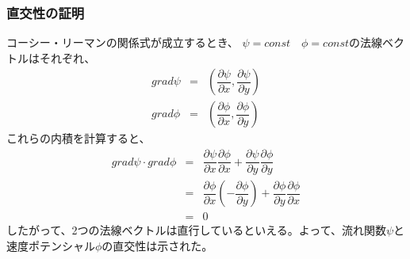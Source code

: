 \documentclass[a4paper]{jsarticle}
\begin{document}
\subsubsection{直交性の証明}
コーシー・リーマンの関係式が成立するとき、
$\psi=const\quad \phi=const$の法線ベクトルはそれぞれ、
\begin{eqnarray*}
    grad \psi&=&\left(\dfrac{\partial \psi}{\partial x}, \dfrac{\partial \psi}{\partial y}\right)\\
    grad \phi&=&\left(\dfrac{\partial \phi}{\partial x}, \dfrac{\partial \phi}{\partial y}\right)
\end{eqnarray*}
これらの内積を計算すると、
\begin{eqnarray*}
    grad\psi \cdot grad\phi &=& \dfrac{\partial \psi}{\partial x}\dfrac{\partial \phi}{\partial x} +\dfrac{\partial \psi}{\partial y}\dfrac{\partial \phi}{\partial y}\\
    &=&\dfrac{\partial \phi}{\partial x}\left(-\dfrac{\partial \phi}{\partial y}\right)+\dfrac{\partial \phi}{\partial y}\dfrac{\partial \phi}{\partial x}\\
    &=&0
\end{eqnarray*}
したがって、2つの法線ベクトルは直行しているといえる。よって、流れ関数$\psi$と速度ポテンシャル$\phi$の直交性は示された。
\end{document}
